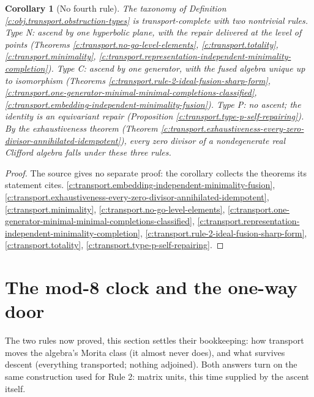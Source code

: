 \documentclass[11pt]{article}
\newtheorem{corollary}[theorem]{Corollary}
\theoremstyle{definition}
\theoremstyle{plain}
\newcommand{\changedmark}[2]{\marginpar{\raggedright\scriptsize\color{#1}#2}}
\begin{document}
\begin{corollary}[No fourth rule]\label{c:transport.no-fourth-rule}
\changedmark{gray}{reworded}
The taxonomy of Definition \ref{c:obj.transport.obstruction-types} is transport-complete with two nontrivial rules. Type N: ascend by one hyperbolic plane, with the repair delivered at the level of points (Theorems \ref{c:transport.no-go-level-elements}, \ref{c:transport.totality}, \ref{c:transport.minimality}, \ref{c:transport.representation-independent-minimality-completion}). Type C: ascend by one generator, with the fused algebra unique up to isomorphism (Theorems \ref{c:transport.rule-2-ideal-fusion-sharp-form}, \ref{c:transport.one-generator-minimal-minimal-completions-classified}, \ref{c:transport.embedding-independent-minimality-fusion}). Type P: no ascent; the identity is an equivariant repair (Proposition \ref{c:transport.type-p-self-repairing}). By the exhaustiveness theorem (Theorem \ref{c:transport.exhaustiveness-every-zero-divisor-annihilated-idempotent}), every zero divisor of a nondegenerate real Clifford algebra falls under these three rules.
\end{corollary}
\begin{proof}
The source gives no separate proof: the corollary collects the theorems its statement cites. \ref{c:transport.embedding-independent-minimality-fusion}, \ref{c:transport.exhaustiveness-every-zero-divisor-annihilated-idempotent}, \ref{c:transport.minimality}, \ref{c:transport.no-go-level-elements}, \ref{c:transport.one-generator-minimal-minimal-completions-classified}, \ref{c:transport.representation-independent-minimality-completion}, \ref{c:transport.rule-2-ideal-fusion-sharp-form}, \ref{c:transport.totality}, \ref{c:transport.type-p-self-repairing}.

\end{proof}

\section{The mod-8 clock and the one-way door}

\label{c:note.transport.setting-mod-8-clock-one-way}
The two rules now proved, this section settles their bookkeeping: how transport moves the algebra's Morita class (it almost never does), and what survives descent (everything transported; nothing adjoined). Both answers turn on the same construction used for Rule 2: matrix units, this time supplied by the ascent itself.
\end{document}

